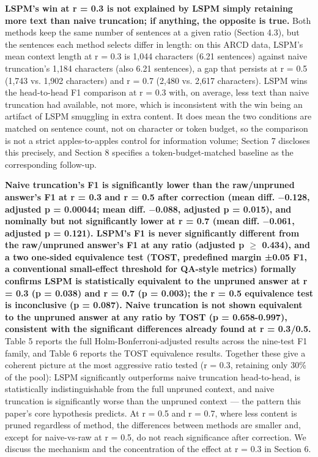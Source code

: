 \textbf{LSPM's win at r = 0.3 is not explained by LSPM simply retaining more text than naive truncation; if anything, the opposite is true.} Both methods keep the same number of sentences at a given ratio (Section 4.3), but the sentences each method selects differ in length: on this ARCD data, LSPM's mean context length at r = 0.3 is 1,044 characters (6.21 sentences) against naive truncation's 1,184 characters (also 6.21 sentences), a gap that persists at r = 0.5 (1,743 vs. 1,902 characters) and r = 0.7 (2,480 vs. 2,617 characters). LSPM wins the head-to-head F1 comparison at r = 0.3 with, on average, less text than naive truncation had available, not more, which is inconsistent with the win being an artifact of LSPM smuggling in extra content. It does mean the two conditions are matched on sentence count, not on character or token budget, so the comparison is not a strict apples-to-apples control for information volume; Section 7 discloses this precisely, and Section 8 specifies a token-budget-matched baseline as the corresponding follow-up.

\textbf{Naive truncation's F1 is significantly lower than the raw/unpruned answer's F1 at r = 0.3 and r = 0.5 after correction (mean diff. $-$0.128, adjusted p = 0.00044; mean diff. $-$0.088, adjusted p = 0.015), and nominally but not significantly lower at r = 0.7 (mean diff. $-$0.061, adjusted p = 0.121). LSPM's F1 is never significantly different from the raw/unpruned answer's F1 at any ratio (adjusted p $\geq$ 0.434), and a two one-sided equivalence test (TOST, predefined margin ±0.05 F1, a conventional small-effect threshold for QA-style metrics) formally confirms LSPM is statistically equivalent to the unpruned answer at r = 0.3 (p = 0.038) and r = 0.7 (p = 0.003); the r = 0.5 equivalence test is inconclusive (p = 0.087). Naive truncation is not shown equivalent to the unpruned answer at any ratio by TOST (p = 0.658-0.997), consistent with the significant differences already found at r = 0.3/0.5.} Table 5 reports the full Holm-Bonferroni-adjusted results across the nine-test F1 family, and Table 6 reports the TOST equivalence results. Together these give a coherent picture at the most aggressive ratio tested (r = 0.3, retaining only 30\% of the pool): LSPM significantly outperforms naive truncation head-to-head, is statistically indistinguishable from the full unpruned context, and naive truncation is significantly worse than the unpruned context --- the pattern this paper's core hypothesis predicts. At r = 0.5 and r = 0.7, where less content is pruned regardless of method, the differences between methods are smaller and, except for naive-vs-raw at r = 0.5, do not reach significance after correction. We discuss the mechanism and the concentration of the effect at r = 0.3 in Section 6.

